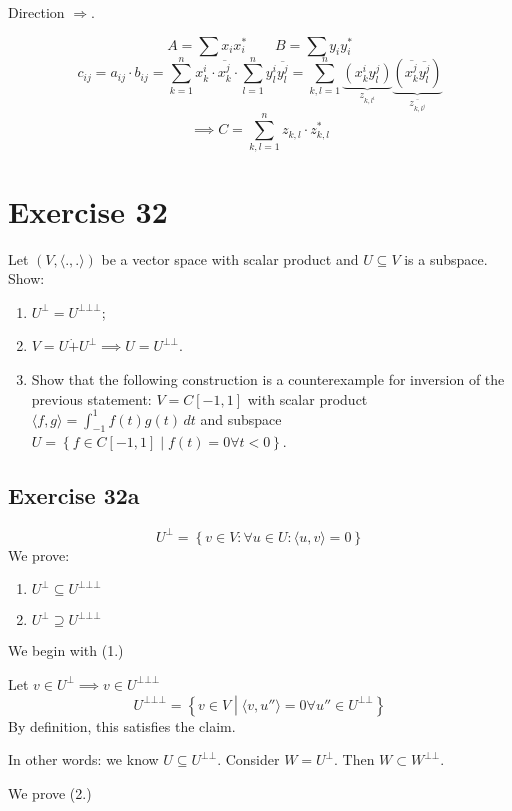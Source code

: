 \documentclass[a4paper]{article}
\theoremstyle{definition}
\newcommand\set[1]{\left\{#1\right\}}
\newcommand\ip[2]{\langle{#1},{#2}\rangle}
\begin{document}
Direction $\Rightarrow$.

\[ A = \sum x_i x_i^* \qquad B = \sum y_i y_i^* \]
\[
  c_{ij} = a_{ij} \cdot b_{ij}
    = \sum_{k=1}^n x_k^i \cdot \overline{x_k^j} \cdot \sum_{l=1}^n y_l^i \overline{y_l^j}
    = \sum_{k,l=1}^n \underbrace{\left(x_k^i y_l^j\right)}_{z_{k,l^i}} \underbrace{\left(\overline{x_k^j} \overline{y_l^j}\right)}_{\overline{z_{k,l^j}}}
\]
\[
  \implies C = \sum_{k,l=1}^n z_{k,l} \cdot z_{k,l}^*
\]

\section*{Exercise 32}
\begin{ex}
  Let $(V, \ip{.}{.})$ be a vector space with scalar product and $U \subseteq V$ is a subspace. Show:
  \begin{enumerate}
    \item $U^\bot = U^{\bot\bot\bot}$;
    \item $V = U \dot{+} U^{\bot} \implies U = U^{\bot\bot}$.
    \item Show that the following construction is a counterexample for inversion of the previous statement:
      $V = C[-1,1]$ with scalar product $\langle f,g\rangle = \int_{-1}^1 f(t) g(t) \, dt$
      and subspace $U = \set{f \in C[-1,1] \middle| f(t) = 0 \forall t < 0}$.
  \end{enumerate}
\end{ex}

\subsection{Exercise 32a}

\[ U^\bot = \set{v \in V: \forall u \in U: \ip uv = 0} \]
We prove:
\begin{enumerate}
  \item $U^\bot \subseteq U^{\bot\bot\bot}$
  \item $U^\bot \supseteq U^{\bot\bot\bot}$
\end{enumerate}

We begin with (1.)

Let $v \in U^\bot \implies v \in U^{\bot\bot\bot}$
\[ U^{\bot\bot\bot} = \set{v \in V \middle| \ip{v}{u''} = 0 \forall u'' \in U^{\bot\bot}} \]
By definition, this satisfies the claim.

In other words: we know $U \subseteq U^{\bot\bot}$. Consider $W = U^{\bot}$. Then $W \subset W^{\bot\bot}$.

We prove (2.)
\end{document}
